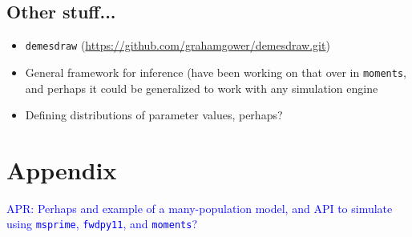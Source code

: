 \documentclass[11pt]{article}
\newcommand{\msprime}[0]{\texttt{msprime}}
\newcommand{\moments}[0]{\texttt{moments}}
\newcommand{\fwdpy}[0]{\texttt{fwdpy11}}
\newcommand{\aprcomment}[1]{{\textcolor{blue}{APR: #1}}}
\begin{document}
\subsection*{Other stuff...}

\begin{itemize}
    \item \texttt{demesdraw} (\url{https://github.com/grahamgower/demesdraw.git})
    \item General framework for inference (have been working on that over in \moments,
        and perhaps it could be generalized to work with any simulation engine
    \item Defining distributions of parameter values, perhaps?
\end{itemize}




\section*{Appendix}

\aprcomment{Perhaps and example of a many-population model, and API to simulate using
\msprime, \fwdpy, and \moments?}
\end{document}
